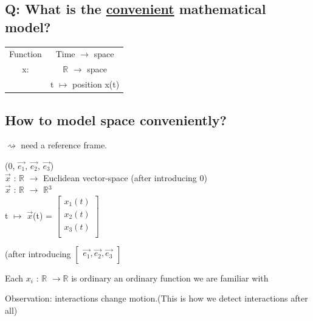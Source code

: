 \documentclass[a4paper, 12pt]{article}
\begin{document}
\subsection{Q: What is the \underline{convenient} mathematical model?}
\begin{center}
\begin{tabular}{cc}
Function & Time $\rightarrow$ space\\
x: & $\mathbb{R}$ $\rightarrow$ space\\
& t $\mapsto$ position x(t)
\end{tabular}
\end{center}

\subsection{How to model space conveniently?}
$\rightsquigarrow$ need a reference frame.
\begin{center}
(0, $\vec{e_1}$, $\vec{e_2}$, $\vec{e_3}$)\\
$\vec{x}$ : $\mathbb{R}$ $\rightarrow$ Euclidean vector-space (after introducing 0)\\
$\vec{x}$ : $\mathbb{R}$ $\rightarrow$ $\mathbb{R}$$^3$\\
t $\mapsto$ $\vec{x}$(t) = 
$\begin{bmatrix}
x_1(t)\\ 
x_2(t)\\ 
x_3(t)\\ 
\end{bmatrix}$
\item (after introducing
$\begin{bmatrix}
\vec{e_1}, \vec{e_2}, \vec{e_3}\\
\end{bmatrix}$
\item Each $x_i$ : $\mathbb{R}$ $\rightarrow$$\mathbb{R}$ is ordinary an ordinary function we are familiar with
\centering
{}
\end{center}
Observation: interactions change motion.(This is how we detect interactions after all)
\end{document}
